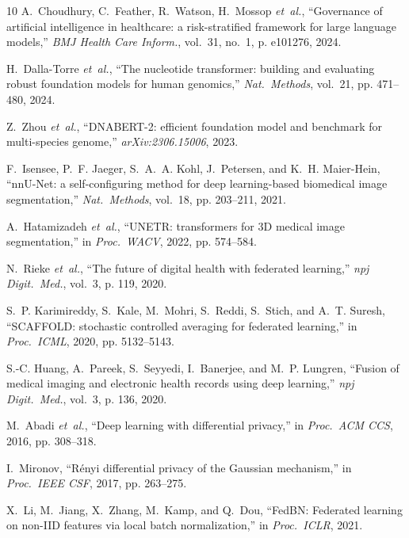 \documentclass{ieeeaccess}
\begin{document}
\begin{thebibliography}{10}
A.~Choudhury, C.~Feather, R.~Watson, H.~Mossop \emph{et~al.}, ``Governance of
  artificial intelligence in healthcare: a risk-stratified framework for large
  language models,'' \emph{BMJ Health Care Inform.}, vol.~31, no.~1, p.
  e101276, 2024.

H.~Dalla-Torre \emph{et~al.}, ``The nucleotide transformer: building and
  evaluating robust foundation models for human genomics,'' \emph{Nat.\
  Methods}, vol.~21, pp. 471--480, 2024.

Z.~Zhou \emph{et~al.}, ``{DNABERT-2}: efficient foundation model and benchmark
  for multi-species genome,'' \emph{arXiv:2306.15006}, 2023.

F.~Isensee, P.~F. Jaeger, S.~A.~A. Kohl, J.~Petersen, and K.~H. Maier-Hein,
  ``{nnU-Net}: a self-configuring method for deep learning-based biomedical
  image segmentation,'' \emph{Nat.\ Methods}, vol.~18, pp. 203--211, 2021.

A.~Hatamizadeh \emph{et~al.}, ``{UNETR}: transformers for 3{D} medical image
  segmentation,'' in \emph{Proc.\ WACV}, 2022, pp. 574--584.

N.~Rieke \emph{et~al.}, ``The future of digital health with federated
  learning,'' \emph{npj Digit.\ Med.}, vol.~3, p. 119, 2020.

S.~P. Karimireddy, S.~Kale, M.~Mohri, S.~Reddi, S.~Stich, and A.~T. Suresh,
  ``{SCAFFOLD}: stochastic controlled averaging for federated learning,'' in
  \emph{Proc.\ ICML}, 2020, pp. 5132--5143.

S.-C. Huang, A.~Pareek, S.~Seyyedi, I.~Banerjee, and M.~P. Lungren, ``Fusion of
  medical imaging and electronic health records using deep learning,''
  \emph{npj Digit.\ Med.}, vol.~3, p. 136, 2020.

M.~Abadi \emph{et~al.}, ``Deep learning with differential privacy,'' in
  \emph{Proc.\ ACM CCS}, 2016, pp. 308--318.

I.~Mironov, ``R\'{e}nyi differential privacy of the {Gaussian} mechanism,'' in
  \emph{Proc.\ IEEE CSF}, 2017, pp. 263--275.

X.~Li, M.~Jiang, X.~Zhang, M.~Kamp, and Q.~Dou, ``{FedBN}: Federated learning
  on non-{IID} features via local batch normalization,'' in \emph{Proc.\ ICLR},
  2021.


\end{thebibliography}
\end{document}
